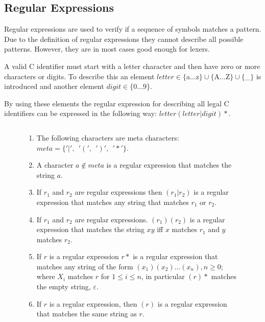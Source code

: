 \subsection{Regular Expressions}
Regular expressions are used to verify if a sequence of symbols matches a
pattern. Due to the definition of regular expressions they cannot describe all
possible patterns. However, they are in most cases good enough for lexers.
\newline
\begin{example}\label{regexpEx}
A valid C identifier must start with a letter character and then have zero or more characters or digits. To describe this an element $letter
\in \{$a$ \dots $z$\} \cup \{$A$ \dots $Z$\} \cup \{$\_$\}$ is introduced and
another element $digit \in \{0 \dots 9\}$.

By using these elements the regular expression for describing all legal C
identifiers can be expressed in the following way: $letter (letter | digit)*$.
\end{example}
\newpage
\begin{figure}[ht!]
\begin{definition}\label{regexp} $ $\\
\begin{enumerate}
  \item The following characters are meta characters: $meta = \{ '|', ~~ '(', ~~ ')', ~~ '*' \}$.
  \item A character $a \notin meta$ is a regular expression that matches the 
      string $a$.
  \item If $r_1$ and $r_2$ are regular expressions then $(r_1 | r_2)$ is a 
      regular expression that matches any string that matches $r_1$ or $r_2$.
  \item If $r_1$ and $r_2$ are regular expressions. $(r_1)(r_2)$ is a regular
      expression that matches the string $xy$ iff $x$ matches $r_1$
      and $y$ matches $r_2$.
  \item If $r$ is a regular expression $r*$ is a regular expression that
      matches any string of the form $(x_1)(x_2) \dots  (x_n), n \geq 0$;
      where $X_i$ matches $r$ for $1 \leq i \leq n$, in particular $(r)*$ 
      matches the empty string, $\varepsilon$.
  \item If $r$ is a regular expression, then $(r)$ is a regular expression that
      matches the same string as $r$.
\end{enumerate}
\qeda
\end{definition}
\end{figure}

